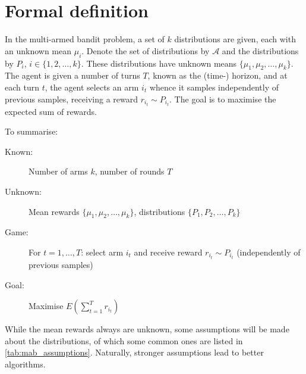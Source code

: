 \section{Formal definition}
In the multi-armed bandit problem, a set of $k$ distributions are given, each with an unknown mean $\mu_i$.
Denote the set of distributions by $\mathcal{A}$ and the distributions by $P_i$, $i \in \{1,2,\dots,k\}$.
These distributions have unknown means $\{\mu_1, \mu_2,\dots,\mu_k\}$.
The agent is given a number of turns $T$, known as the (time-) horizon, and at each turn $t$, the agent selects an arm $i_t$ whence it samples independently of previous samples, receiving a reward $r_{i_t} \sim P_{i_t}$.
The goal is to maximise the expected sum of rewards.

To summarise:
\begin{description}
    \item[Known:] Number of arms $k$, number of rounds $T$
    \item[Unknown:] Mean rewards $\{\mu_1, \mu_2,\dots,\mu_k\}$, distributions $\{P_1, P_2,\dots,P_k\}$
    \item[Game:] For $t=1,\dots,T$: select arm $i_t$ and receive reward $r_{i_t} \sim P_{i_t}$ (independently of previous samples)
    \item[Goal:] Maximise $E(\sum_{t=1}^T r_{i_t})$
\end{description}

While the mean rewards always are unknown, some assumptions will be made about the distributions, of which some common ones are listed in \cref{tab:mab_assumptions}.
Naturally, stronger assumptions lead to better algorithms.


